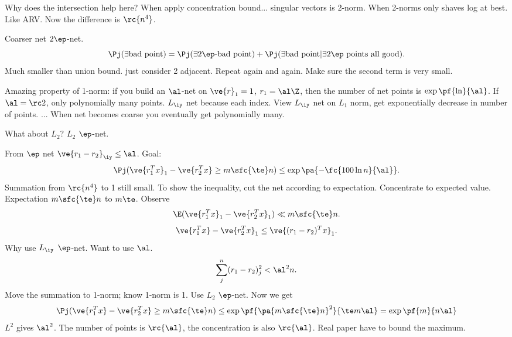 Why does the intersection help here? When apply concentration bound...
singular vectors is 2-norm. When 2-norms only shaves log at best. Like ARV. Now the difference is $\rc{n^4}$. 

Coarser net $2\ep$-net. 
\[
\Pj(\exists \text{bad point})= \Pj(\exists 2\ep\text{-bad point}) + \Pj(\exists \text{bad point}|\exists 2\ep\text{ points all good}).
\]
Much smaller than union bound. just consider 2 adjacent. Repeat again and again. Make sure the second term is very small. 

Amazing property of 1-norm:
if you build an $\al$-net on $\ve{r}_1=1$, $r_1=\al \Z$, then the number of net points is $\exp\pf{\ln}{\al}$. If $\al=\rc2$, only polynomially many points. $L_{\iy}$ net because each index. View $L_{\iy}$ net on $L_1$ norm, get exponentially decrease in number of points. ...
When net becomes coarse you eventually get polynomially many.

What about $L_2$? $L_2$ $\ep$-net. 

From $\ep$ net $\ve{r_1-r_2}_{\iy}\le \al$. Goal:
\[
\Pj(\ve{r_1^Tx}_1-\ve{r_2^Tx}\ge m\sfc{\te}n) \le \exp\pa{
-\fc{100\ln n}{\al}
}.
\]
Summation from $\rc{n^4}$ to 1 still small. 
To show the inequality, cut the net according to expectation. Concentrate to expected value. Expectation $m\sfc{\te}n$ to $m\te$.
Observe
\[
\E(\ve{r_1^Tx}_1-\ve{r_2^Tx}_1)\ll m\sfc{\te}n.
\]
\[
\ve{r_1^Tx}-\ve{r_2^Tx}_1\le \ve{(r_1-r_2)^Tx}_1.
\]
Why use $L_{\iy}$ $\ep$-net. Want to use $\al$.
\[
\sum_j^n(r_1-r_2)_j^2<\al^2 n.
\]
Move the summation to 1-norm; know 1-norm is 1. Use $L_2$ $\ep$-net. 
Now we get 
\[
\Pj(\ve{r_1^Tx}-\ve{r_2^Tx}\ge m\sfc{\te}n)
\le \exp\pf{\pa{m\sfc{\te}n}^2}{\te m \al}=\exp\pf{m}{n\al}
\]
$L^2$ gives $\al^2$. The number of points is $\rc{\al}$, the concentration is also $\rc{\al}$. Real paper have to bound the maximum. 




%
%
